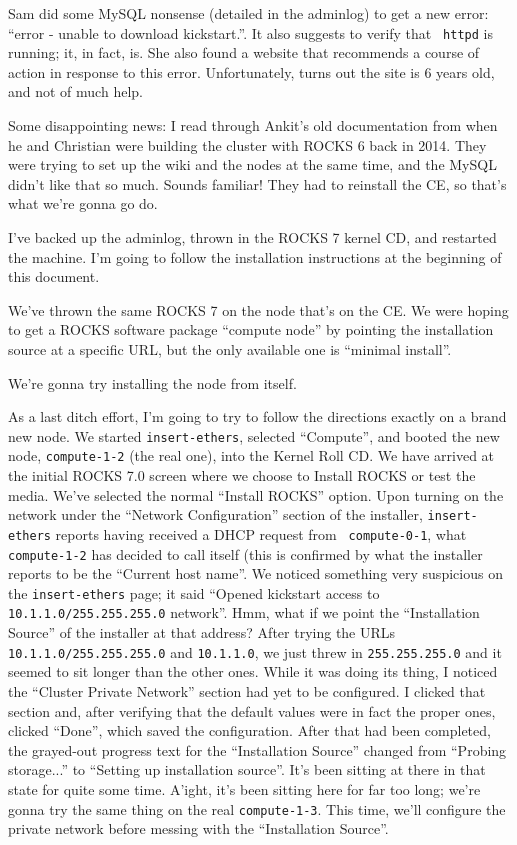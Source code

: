 \documentclass[12pt]{article}
\begin{document}
\qq Sam did some MySQL nonsense (detailed in the adminlog) to get a new error:
``error - unable to download kickstart.''. It also suggests to verify that {\tt
  httpd} is running; it, in fact, is. She also found a website that recommends a
course of action in response to this error. Unfortunately, turns out the site is
6 years old, and not of much help.

\qq Some disappointing news: I read through Ankit's old documentation from when
he and Christian were building the cluster with ROCKS 6 back in 2014. They were
trying to set up the wiki and the nodes at the same time, and the MySQL didn't
like that so much. Sounds familiar! They had to reinstall the CE, so that's what
we're gonna go do.

\qq I've backed up the adminlog, thrown in the ROCKS 7 kernel CD, and restarted
the machine. I'm going to follow the installation instructions at the beginning
of this document.

\qq We've thrown the same ROCKS 7 on the node that's on the CE. We were hoping
to get a ROCKS software package ``compute node'' by pointing the installation
source at a specific URL, but the only available one is ``minimal install''. 

\qq We're gonna try installing the node from itself.

\qq As a last ditch effort, I'm going to try to follow the directions exactly on
a brand new node. We started {\tt insert-ethers}, selected ``Compute'', and
booted the new node, {\tt compute-1-2} (the real one), into the Kernel Roll
CD. We have arrived at the initial ROCKS 7.0 screen where we choose to Install
ROCKS or test the media. We've selected the normal ``Install ROCKS'' option.
Upon turning on the network under the ``Network Configuration'' section of the
installer, {\tt insert-ethers} reports having received a DHCP request from {\tt
  compute-0-1}, what {\tt compute-1-2} has decided to call itself (this is
confirmed by what the installer reports to be the ``Current host name''.  We
noticed something very suspicious on the {\tt insert-ethers} page; it said
``Opened kickstart access to {\tt 10.1.1.0/255.255.255.0} network''. Hmm, what
if we point the ``Installation Source'' of the installer at that address?  After
trying the URLs {\tt 10.1.1.0/255.255.255.0} and {\tt 10.1.1.0}, we just threw
in {\tt 255.255.255.0} and it seemed to sit longer than the other ones. While it
was doing its thing, I noticed the ``Cluster Private Network'' section had yet
to be configured. I clicked that section and, after verifying that the default
values were in fact the proper ones, clicked ``Done'', which saved the
configuration. After that had been completed, the grayed-out progress text for
the ``Installation Source'' changed from ``Probing storage...'' to ``Setting up
installation source''. It's been sitting at there in that state for quite some
time. A'ight, it's been sitting here for far too long; we're gonna try the same
thing on the real {\tt compute-1-3}. This time, we'll configure the private
network before messing with the ``Installation Source''.
\end{document}
